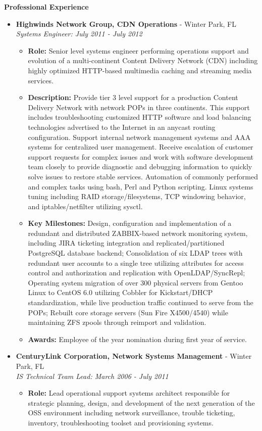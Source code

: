 \documentclass[10pt,oneside]{article}
\newenvironment{ressection}[1]{
  \vspace{4pt}
  \textbf{\selectfont\normalsize#1}
  \begin{itemize}
  \vspace{3pt}
}{
  \end{itemize}
}
\newcommand{\ressubitem}[1]{
  \vspace{-1pt}
  \item \begin{flushleft} #1 \end{flushleft}
}
\newcommand{\resbigitem}[3]{
  \vspace{-5pt}
  \item
  \textbf{#1} - #2 \\
  \textit{#3}
}
\newenvironment{ressubsec}[3]{
  \resbigitem{#1}{#2}{#3}
  \vspace{-2pt}
  \begin{itemize}
}{
  \end{itemize}
}
\begin{document}
\begin{ressection}{Professional Experience}
\begin{ressubsec}{Highwinds Network Group, CDN Operations}{Winter Park, FL}{Systems Engineer: July 2011 - July 2012}
    \ressubitem{\textbf{Role:} Senior level systems engineer performing operations support and evolution of a multi-continent Content Delivery Network (CDN) including highly optimized HTTP-based multimedia caching and streaming media services.}

    \ressubitem{\textbf{Description:} Provide tier 3 level support for a production Content Delivery Network with network POPs in three continents.  This support includes troubleshooting customized HTTP software and load balancing technologies advertised to the Internet in an anycast routing configuration.  Support internal network management systems and AAA systems for centralized user management. Receive escalation of customer support requests for complex issues and work with software development team closely to provide diagnostic and debugging information to quickly solve issues to restore stable services.  Automation of commonly performed and complex tasks using bash, Perl and Python scripting. Linux systems tuning including RAID storage/filesystems, TCP windowing behavior, and iptables/netfilter utilizing sysctl.}

    \ressubitem{\textbf{Key Milestones:} Design, configuration and implementation of a redundant and distributed ZABBIX-based network monitoring system, including JIRA ticketing integration and replicated/partitioned PostgreSQL database backend; Consolidation of six LDAP trees with redundant user accounts to a single tree utilizing attributes for access control and authorization and replication with OpenLDAP/SyncRepl; Operating system migration of over 300 physical servers from Gentoo Linux to CentOS 6.0 utilizing Cobbler for Kickstart/DHCP standardization, while live production traffic continued to serve from the POPs; Rebuilt core storage servers (Sun Fire X4500/4540) while maintaining ZFS zpools through reimport and validation.}

    \ressubitem{\textbf{Awards:} Employee of the year nomination during first year of service.}

  \end{ressubsec}

  \begin{ressubsec}{CenturyLink Corporation, Network Systems Management}{Winter Park, FL}{IS Technical Team Lead: March 2006 - July 2011}

    \ressubitem{\textbf{Role:} Lead operational support systems architect responsible for strategic planning, design, and development of the next generation of the OSS environment including network surveillance, trouble ticketing, inventory, troubleshooting toolset and provisioning systems.}


\end{ressubsec}
\end{ressection}
\end{document}
